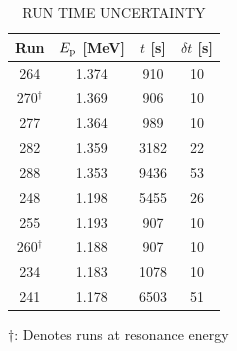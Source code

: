 \begin{table}[h]
    \begin{center}
        \caption{RUN TIME UNCERTAINTY}
        \label{tab:run-time-uncertainty}
        \begin{tabular}{cccc}
            \toprule
            \midrule
            \textbf{Run} & \textbf{$E_{\rm p}$ [MeV]} & \textbf{$t$ [s]}
                & \textbf{$\delta t$ [s]} \\
            \midrule
                264           & 1.374 &  910 & 10 \\
                270$^\dagger$ & 1.369 &  906 & 10 \\
                277           & 1.364 &  989 & 10 \\
                282           & 1.359 & 3182 & 22 \\
                288           & 1.353 & 9436 & 53 \\
                248           & 1.198 & 5455 & 26 \\
                255           & 1.193 &  907 & 10 \\
                260$^\dagger$ & 1.188 &  907 & 10 \\
                234           & 1.183 & 1078 & 10 \\
                241           & 1.178 & 6503 & 51 \\
            \bottomrule
        \end{tabular}

        \vspace{0.5em}
        $\dagger$: Denotes runs at resonance energy
    \end{center}
\end{table}

